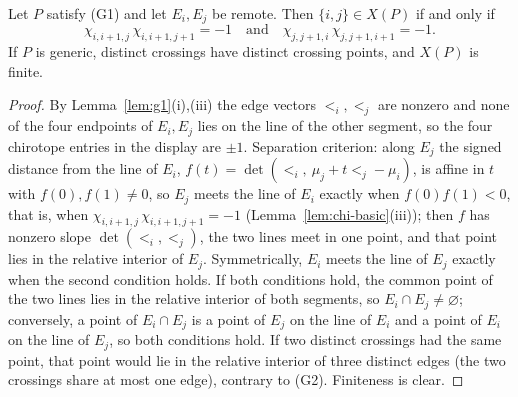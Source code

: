 \begin{lemma}\label{lem:crossing-test}
Let $P$ satisfy (G1) and let $E_i,E_j$ be remote. Then $\{i,j\}\in X(P)$ if
and only if
\[
\chi_{i,i+1,j}\,\chi_{i,i+1,j+1}=-1\quad\text{and}\quad
\chi_{j,j+1,i}\,\chi_{j,j+1,i+1}=-1.
\]
If $P$ is generic, distinct crossings have distinct crossing points, and
$X(P)$ is finite. 
\end{lemma}
\begin{proof}
By Lemma~\ref{lem:g1}(i),(iii) the edge vectors $\lt_i,\lt_j$ are nonzero and
none of the four endpoints of $E_i,E_j$ lies on the line of the other segment,
so the four chirotope entries in the display are $\pm1$. Separation
criterion: along $E_j$ the signed distance from the line of $E_i$,
$f(t)=\det(\lt_i,\ \mu_j+t\lt_j-\mu_i)$, is affine in $t$ with
$f(0),f(1)\neq0$, so $E_j$ meets the line of $E_i$ exactly when
$f(0)f(1)<0$, that is, when $\chi_{i,i+1,j}\,\chi_{i,i+1,j+1}=-1$
(Lemma~\ref{lem:chi-basic}(iii)); then $f$ has nonzero slope
$\det(\lt_i,\lt_j)$, the two lines meet in one point, and that point lies in
the relative interior of $E_j$. Symmetrically, $E_i$ meets the line of $E_j$
exactly when the second condition holds. If both conditions hold, the common
point of the two lines lies in the relative interior of both segments, so
$E_i\cap E_j\neq\varnothing$; conversely, a point of $E_i\cap E_j$ is a point
of $E_j$ on the line of $E_i$ and a point of $E_i$ on the line of $E_j$, so
both conditions hold. If two distinct crossings had the same point, that
point would lie in the relative interior of three distinct edges (the two
crossings share at most one edge), contrary to (G2). Finiteness is clear.
\end{proof}


